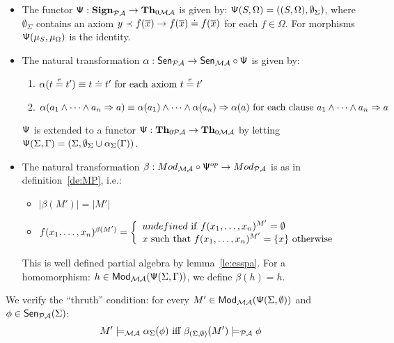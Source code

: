 \documentclass[10pt]{article}
\begin{document}
\begin{PROOF}
\begin{itemize}
\item The functor ${\sf {\Psi}}: {\bf Sign}_{{\mathcal{PA}}} \to {\bf Th}_{0{\mathcal{MA}}}$ is given
by: ${\sf {\Psi}}(S,\Omega)= ((S,\Omega),\emptyset_{\Sigma})$, where
$\emptyset_{\Sigma}$ contains an axiom $y \prec f(\overline{x}) \to
f(\overline{x}) \mathrel{\dot{=} } f(\overline{x})$ for each $f\in\Omega$. For  morphisms
${\sf {\Psi}}(\mu_S,\mu_{\Omega})$ is the identity.  
\item The natural transformation
$\alpha: {\sf {Sen}}_{{\mathcal{PA}}} \to {\sf {Sen}}_{{\mathcal{MA}}} \circ {\sf {\Psi}}$ is given by:
   \begin{enumerate} 
    \item $\alpha(t \stackrel{e}{=} t') \equiv t \mathrel{\dot{=} } t'\mbox{ for
each axiom }t \stackrel{e}{=} t'$ 
    \item $\alpha(a_1 \wedge \cdots \wedge a_n
\Rightarrow a) \equiv \alpha(a_1) \wedge \cdots \wedge \alpha(a_n)
\Rightarrow \alpha(a)\mbox{ for each clause }a_1 \wedge \cdots \wedge
a_n \Rightarrow a$ 
   \end{enumerate}
${\sf {\Psi}}$ is extended to a functor 
${\sf {\Psi}}: {\bf Th}_{0{\mathcal{PA}}} \to {\bf Th}_{0{\mathcal{MA}}}$ by letting
${\sf {\Psi}}(\Sigma,\Gamma) = (\Sigma,\emptyset_\Sigma\cup\alpha_\Sigma(\Gamma))$.
%
\item 
The natural transformation $\beta: Mod_{{\mathcal{MA}}}
	\circ {\sf {\Psi}}^{op} \to Mod_{{\mathcal{PA}}}$ is as in definition~\ref{de:MP}, i.e.:
\begin{itemize}
	\item $|\beta(M')| = |M'|$
	\item $f(x_1, \ldots ,x_n)^{\beta(M')} = \left\{\begin{array}{l}
	  undefined\ {\rm if}\ f(x_1, \ldots ,x_n)^{M'}=\emptyset \\
          x\ {\rm such\ that}\ f(x_1, \ldots ,x_n)^{M'}=\{x\}\ {\rm otherwise} \end{array}\right.$
    \end{itemize}
This is well defined partial algebra by lemma~\ref{le:esspa}.
For a homomorphism:  $h \in {\sf {Mod}}_{{\mathcal{MA}}}({\sf {\Psi}}(\Sigma,\Gamma))$, we define $\beta(h) = h$.
\end{itemize}
%
We verify the ``thruth'' condition: for every $M'\in{\sf {Mod}}_{{\mathcal{MA}}}({\sf {\Psi}}(\Sigma,\emptyset))$ and $\phi \in {\sf {Sen}}_{{\mathcal{PA}}}(\Sigma)$:
\begin{equation}
\label{eq:tcp} 
M' \models_{\inst{MA}} \alpha_{\Sigma}(\phi) \mbox{ iff } 
\beta_{(\Sigma,\emptyset)} (M') \models_{\inst{PA}} \phi  

\end{equation}
\end{PROOF}
\end{document}
